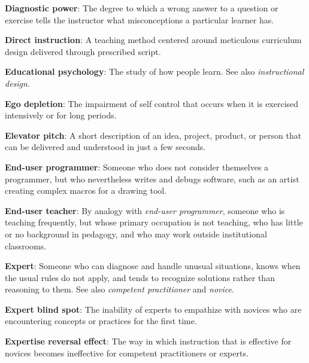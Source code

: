 \textbf{\hypertarget{g:diagnostic-power}{Diagnostic power}\label{g:diagnostic-power}}: The degree to which a
wrong answer to a question or exercise tells the instructor what
misconceptions a particular learner has.

\textbf{\hypertarget{g:direct-instruction}{Direct instruction}\label{g:direct-instruction}}: A teaching method
centered around meticulous curriculum design delivered through
prescribed script.

\textbf{\hypertarget{g:educational-psychology}{Educational psychology}\label{g:educational-psychology}}: The study
of how people learn. See also \emph{instructional design}.

\textbf{\hypertarget{g:ego-depletion}{Ego depletion}\label{g:ego-depletion}}: The impairment of self
control that occurs when it is exercised intensively or for long
periods.

\textbf{\hypertarget{g:elevator-pitch}{Elevator pitch}\label{g:elevator-pitch}}: A short description of an
idea, project, product, or person that can be delivered and understood
in just a few seconds.

\textbf{\hypertarget{g:end-user-programmer}{End-user programmer}\label{g:end-user-programmer}}: Someone who
does not consider themselves a programmer, but who nevertheless writes
and debugs software, such as an artist creating complex macros for a
drawing tool.

\textbf{\hypertarget{g:end-user-teacher}{End-user teacher}\label{g:end-user-teacher}}: By analogy with
\emph{end-user programmer}, someone who is teaching frequently, but whose
primary occupation is not teaching, who has little or no background in
pedagogy, and who may work outside institutional classrooms.

\textbf{\hypertarget{g:expert}{Expert}\label{g:expert}}: Someone who can diagnose and handle
unusual situations, knows when the usual rules do not apply, and tends
to recognize solutions rather than reasoning to them. See also
\emph{competent practitioner} and \emph{novice}.

\textbf{\hypertarget{g:expert-blind-spot}{Expert blind spot}\label{g:expert-blind-spot}}: The inability of
experts to empathize with novices who are encountering concepts or
practices for the first time.

\textbf{\hypertarget{g:expertise-reversal}{Expertise reversal effect}\label{g:expertise-reversal}}: The way in
which instruction that is effective for novices becomes ineffective for
competent practitioners or experts.

